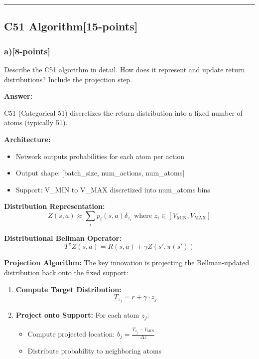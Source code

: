 \documentclass[12pt]{article}
\begin{document}
{{\noindent\rule{\textwidth}{0.2pt}

\subsection{C51 Algorithm[15-points]}
\subsubsection{a)[8-points]} Describe the C51 algorithm in detail. How does it represent and update return distributions? Include the projection step.

\textbf{Answer:}

C51 (Categorical 51) discretizes the return distribution into a fixed number of atoms (typically 51).

\textbf{Architecture:}
\begin{itemize}
\item Network outputs probabilities for each atom per action
\item Output shape: [batch\_size, num\_actions, num\_atoms]
\item Support: V\_MIN to V\_MAX discretized into num\_atoms bins
\end{itemize}

\textbf{Distribution Representation:}
\begin{equation}
Z(s,a) \approx \sum_i p_i(s,a) \delta_{z_i} \text{ where } z_i \in [V_{\text{MIN}}, V_{\text{MAX}}]
\end{equation}

\textbf{Distributional Bellman Operator:}
\begin{equation}
T^\pi Z(s,a) = R(s,a) + \gamma Z(s', \pi(s'))
\end{equation}

\textbf{Projection Algorithm:}
The key innovation is projecting the Bellman-updated distribution back onto the fixed support:

\begin{enumerate}
\item \textbf{Compute Target Distribution:}
\begin{equation}
T_{z_j} = r + \gamma \cdot z_j
\end{equation}

\item \textbf{Project onto Support:}
For each atom $z_j$:
\begin{itemize}
\item Compute projected location: $b_j = \frac{T_{z_j} - V_{\text{MIN}}}{\Delta z}$
\item Distribute probability to neighboring atoms
\end{itemize}


\end{enumerate}}}
\end{document}
